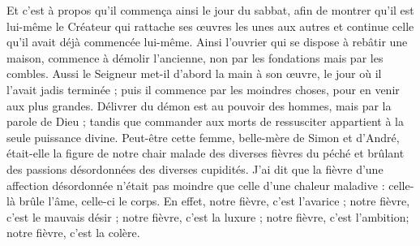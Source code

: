 Et c’est à propos qu’il commença ainsi le jour du sabbat, afin de montrer qu’il est lui-même le Créateur qui rattache ses œuvres les unes aux autres et continue celle qu’il avait déjà commencée lui-même. Ainsi l’ouvrier qui se dispose à rebâtir une maison, commence à démolir l’ancienne, non par les fondations mais par les combles. Aussi le Seigneur met-il d’abord la main à son œuvre, le jour où il l’avait jadis terminée ; puis il commence par les moindres choses, pour en venir aux plus grandes. Délivrer du démon est au pouvoir des hommes, mais par la parole de Dieu ; tandis que commander aux morts de ressusciter appartient à la seule puissance divine. Peut-être cette femme, belle-mère de Simon et d’André, était-elle la figure de notre chair malade des diverses fièvres du péché et brûlant des passions désordonnées des diverses cupidités. J’ai dit que la fièvre d’une affection désordonnée n’était pas moindre que celle d’une chaleur maladive : celle-là brûle l’âme, celle-ci le corps. En effet, notre fièvre, c’est l’avarice ; notre fièvre, c’est le mauvais désir ; notre fièvre, c’est la luxure ; notre fièvre, c’est l’ambition; notre fièvre, c'est la colère.
